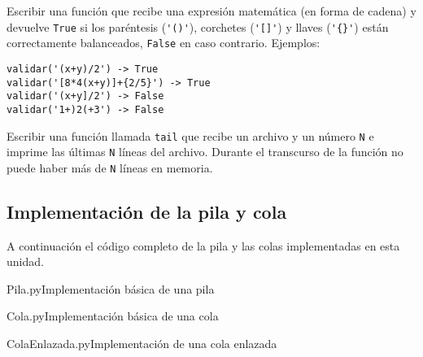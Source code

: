 \begin{ejercicio}
Escribir una función que recibe una expresión matemática (en forma de cadena) y
devuelve \verb|True| si los paréntesis (\verb|'()'|), corchetes
(\verb|'[]'|) y llaves (\verb|'{}'|) están correctamente balanceados,
\verb|False| en caso contrario. Ejemplos:
\begin{lstlisting}[numbers=none]
validar('(x+y)/2') -> True
validar('[8*4(x+y)]+{2/5}') -> True
validar('(x+y]/2') -> False
validar('1+)2(+3') -> False
\end{lstlisting}
\end{ejercicio}

\begin{ejercicio}
Escribir una función llamada \lstinline|tail| que recibe un archivo y un número
\lstinline|N| e imprime las últimas \lstinline|N| líneas del archivo. Durante
el transcurso de la función no puede haber más de \lstinline|N| líneas en
memoria.
\end{ejercicio}

\newpage
\begin{subappendices}
\section{Implementación de la pila y cola}

A continuación el código completo de la pila y las colas implementadas en
esta unidad.

\begin{codigo}{Pila.py}{Implementación básica de una pila}

\end{codigo}

\begin{codigo}{Cola.py}{Implementación básica de una cola}

\end{codigo}

\begin{codigo}{ColaEnlazada.py}{Implementación de una cola enlazada}

\end{codigo}
\end{subappendices}
